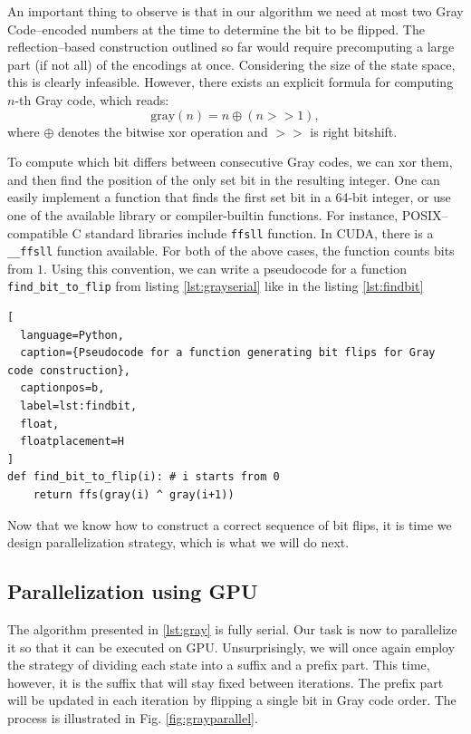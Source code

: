 An important thing to observe is that in our algorithm we need at most two Gray
Code--encoded numbers at the time to determine the bit to be flipped. The
reflection--based construction outlined so far would require precomputing a
large part (if not all) of the encodings at once. Considering the size of the
state space, this is clearly infeasible. However, there exists an explicit
formula for computing $n$-th Gray code, which reads:
\begin{equation}
  \mbox{gray}(n) = n \oplus (n >> 1),
\end{equation}
where $\oplus$ denotes the bitwise xor operation and $>>$ is right bitshift.

To compute which bit differs between consecutive Gray codes, we can xor them,
and then find the position of the only set bit in the resulting integer. One
can easily implement a function that finds the first set bit in a 64-bit
integer, or use one of the available library or compiler-builtin functions. For
instance, POSIX--compatible C standard libraries include \texttt{ffsll}
function. In CUDA, there is a \texttt{\_\_ffsll} function available. For both
of the above cases, the function counts bits from $1$. Using this convention,
we can write a pseudocode for a function \texttt{find\_bit\_to\_flip} from
listing \ref{lst:grayserial} like in the listing \ref{lst:findbit}

\begin{lstlisting}[
  language=Python,
  caption={Pseudocode for a function generating bit flips for Gray code construction},
  captionpos=b,
  label=lst:findbit,
  float,
  floatplacement=H
]
def find_bit_to_flip(i): # i starts from 0
    return ffs(gray(i) ^ gray(i+1))
\end{lstlisting}

Now that we know how to construct a correct sequence of bit flips, it is time
we design parallelization strategy, which is what we will do next.

\subsection{Parallelization using GPU}
The algorithm presented in \ref{lst:gray} is fully serial. Our task is now to
parallelize it so that it can be executed on GPU. Unsurprisingly, we will once
again employ the strategy of dividing each state into a suffix and a prefix
part. This time, however, it is the suffix that will stay fixed between
iterations. The prefix part will be updated in each iteration by flipping a
single bit in Gray code order. The process is illustrated in Fig.
\ref{fig:grayparallel}.

